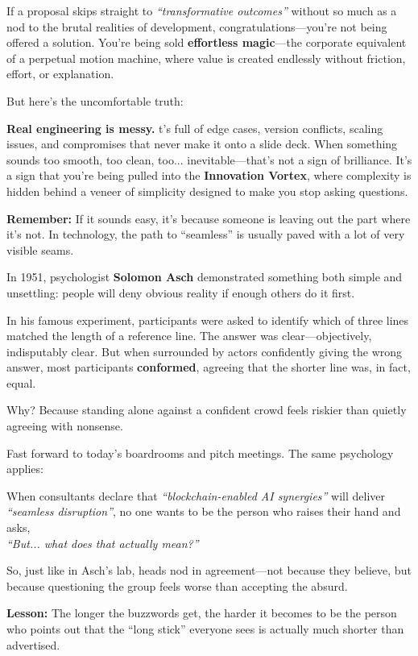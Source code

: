   If a proposal skips straight to \textit{``transformative outcomes''} without so much as a nod to the brutal realities of development, congratulations—you’re not being offered a solution.  You’re being sold \textbf{effortless magic}—the corporate equivalent of a perpetual motion machine, where value is created endlessly without friction, effort, or explanation.
  
  But here’s the uncomfortable truth:
  
  \textbf{Real engineering is messy.} t’s full of edge cases, version conflicts, scaling issues, and compromises that never make it onto a slide deck. When something sounds too smooth, too clean, too... inevitable—that’s not a sign of brilliance. It’s a sign that you're being pulled into the \textbf{Innovation Vortex}, where complexity is hidden behind a veneer of simplicity designed to make you stop asking questions.
  
  \textbf{Remember:} If it sounds easy, it's because someone is leaving out the part where it’s not.  In technology, the path to ``seamless'' is usually paved with a lot of very visible seams.

  \begin{tcolorbox}[title=Historical Sidebar: The Asch Conformity Experiment — When Everyone Pretends the Short Stick is Long, colback=gray!5, colframe=black]
    In 1951, psychologist \textbf{Solomon Asch} demonstrated something both simple and unsettling: people will deny obvious reality if enough others do it first.
    
    In his famous experiment, participants were asked to identify which of three lines matched the length of a reference line. The answer was clear—objectively, indisputably clear. But when surrounded by actors confidently giving the wrong answer, most participants \textbf{conformed}, agreeing that the shorter line was, in fact, equal.
    
    Why? Because standing alone against a confident crowd feels riskier than quietly agreeing with nonsense.
    
    \medskip
    
    Fast forward to today’s boardrooms and pitch meetings. The same psychology applies:
    
    When consultants declare that \textit{``blockchain-enabled AI synergies''} will deliver \textit{``seamless disruption''}, no one wants to be the person who raises their hand and asks, \\
    \textit{``But... what does that actually mean?''}
    
    So, just like in Asch’s lab, heads nod in agreement—not because they believe, but because questioning the group feels worse than accepting the absurd.
    
    \medskip
    
    \textbf{Lesson:} The longer the buzzwords get, the harder it becomes to be the person who points out that the ``long stick'' everyone sees is actually much shorter than advertised.
    \end{tcolorbox}
   
